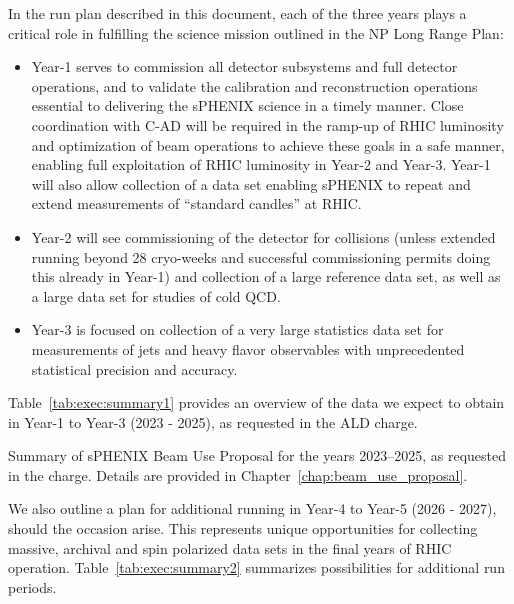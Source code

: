 In the run plan described in this document, each of the three years
plays a critical role in fulfilling the science mission outlined in
the NP Long Range Plan:
\begin{itemize}
\item Year-1 serves to commission all detector subsystems and full
  detector operations, and to validate the calibration and
  reconstruction operations essential to delivering the sPHENIX
  science in a timely manner. Close coordination with C-AD will be
  required in the ramp-up of RHIC luminosity and optimization of beam
  operations to achieve these goals in a safe manner, enabling full
  exploitation of RHIC luminosity in Year-2 and Year-3. Year-1 will
  also allow collection of a \auau data set enabling sPHENIX to repeat
  and extend measurements of ``standard candles'' at RHIC.
\item Year-2 will see commissioning of the detector for \pp collisions
  (unless extended running beyond 28 cryo-weeks and successful \auau
  commissioning permits doing this already in Year-1) and collection
  of a large \pp reference data set, as well as a large \pAu data set
  for studies of cold QCD.
\item Year-3 is focused on collection of a very large statistics \auau
  data set for measurements of jets and heavy flavor observables with
  unprecedented statistical precision and accuracy.
\end{itemize}

Table~\ref{tab:exec:summary1} provides an overview of the data we
expect to obtain in Year-1 to Year-3 (2023 - 2025), as requested in the ALD charge.

\begin{table}[hbt!]
\centering
\caption{\label{tab:exec:summary1} Summary of sPHENIX Beam Use Proposal for the years
  2023--2025, as requested in the charge.  Details are provided in
  Chapter~\ref{chap:beam_use_proposal}.} 
\bigskip \centering 
\end{table}

We also outline a plan for additional running in Year-4 to Year-5 (2026 - 2027), should the occasion
arise. This represents unique opportunities for collecting massive,
archival \apa and spin polarized \pp data sets in the final years of
RHIC operation.  Table~\ref{tab:exec:summary2} summarizes possibilities for
additional run periods.

